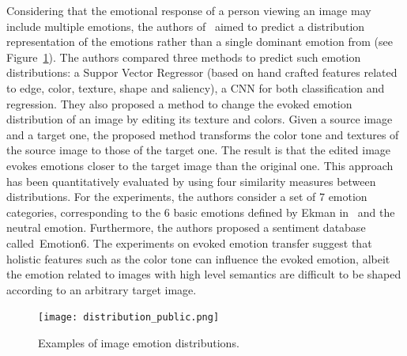 Considering that the emotional response of a person viewing an image may include multiple emotions, the authors of~\cite{peng2015mixed} aimed to predict a distribution representation of the emotions rather than a single dominant emotion from (see Figure~\ref{figDistribution}). The authors compared three methods to predict such emotion distributions: a Suppor Vector Regressor (based on hand crafted features related to edge, color, texture, shape and saliency), a CNN for both classification and regression. They also proposed a method to change the evoked emotion distribution of an image by editing its texture and colors. Given a source image and a target one, the proposed method transforms the color tone and textures of the source image to those of the target one. 
The result is that the edited image evokes emotions closer to the target image than the original one. This approach has been quantitatively evaluated by using four similarity measures between distributions.
For the experiments, the authors consider a set of 7 emotion categories, corresponding to the 6 basic emotions defined by Ekman in~\cite{ekman1987universals} and the neutral emotion. Furthermore, the authors proposed a sentiment database called~Emotion6. The experiments on evoked emotion transfer suggest that holistic features such as the color tone can influence the evoked emotion, albeit the emotion related to images with high level semantics are difficult to be shaped according to an arbitrary target image.

\begin{figure}[t]
	\centering
	\texttt{[image: distribution\_public.png]}
	\caption{Examples of image emotion distributions.}
	\label{figDistribution}
\end{figure}

